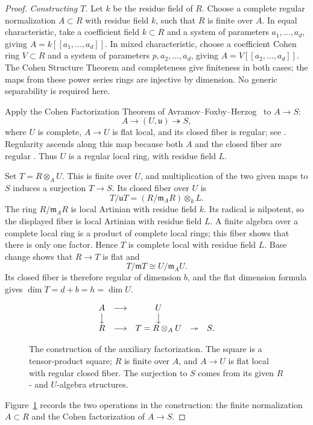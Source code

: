 \begin{proof}
\emph{Constructing $T$.}
Let $k$ be the residue field of $R$.  Choose a complete regular
normalization $A\subset R$ with residue field $k$, such that $R$ is
finite over $A$.  In equal characteristic, take a coefficient field
$k\subset R$ and a system of parameters $a_1,\ldots,a_d$, giving
$A=k[[a_1,\ldots,a_d]]$.  In mixed characteristic, choose a coefficient
Cohen ring $V\subset R$ and a system of parameters
$p,a_2,\ldots,a_d$, giving $A=V[[a_2,\ldots,a_d]]$.  The Cohen
Structure Theorem and completeness give finiteness in both cases;
the maps from these power series rings are injective by dimension.
No generic separability is required here.

Apply the Cohen Factorization Theorem of
Avramov--Foxby--Herzog~\cite{AFH} to $A\to S$:
\[
  A\longrightarrow (U,\mathfrak u)\twoheadrightarrow S,
\]
where $U$ is complete, $A\to U$ is flat local, and its closed fiber is
regular; see \cite[Theorem~3.1]{Ma}.  Regularity ascends along this map
because both $A$ and the closed fiber are regular
\cite[Tag~031E]{Stacks}. Thus $U$ is a
regular local ring, with residue field $L$.

Set $T=R\otimes_A U$.  This is finite over $U$, and multiplication of
the two given maps to $S$ induces a surjection $T\to S$.  Its closed
fiber over $U$ is
\[
  T/\mathfrak uT=(R/\mathfrak m_A R)\otimes_k L.
\]
The ring $R/\mathfrak m_A R$ is local Artinian with residue field $k$.
Its radical is nilpotent, so the displayed fiber is local Artinian
with residue field $L$.  A finite algebra over a complete local ring
is a product of complete local rings; this fiber shows that there is
only one factor.  Hence $T$ is complete local with residue field $L$.
Base change shows that $R\to T$ is flat and
\[
  T/\mathfrak mT\cong U/\mathfrak m_A U.
\]
Its closed fiber is therefore regular of dimension $b$, and the flat
dimension formula gives $\dim T=d+b=h=\dim U$.

\begin{figure}[ht]
\centering
\[
\begin{array}{ccccc}
 A&\longrightarrow&U&&\\
 \big\downarrow&&\big\downarrow&&\\
 R&\longrightarrow&T=R\otimes_A U&\twoheadrightarrow&S .
\end{array}
\]
\caption{The construction of the auxiliary factorization. The square
is a tensor-product square; $R$ is finite over $A$, and $A\to U$
is flat local with regular closed fiber. The surjection to $S$
comes from its given $R$- and $U$-algebra structures.}
\label{fig:factorization}
\end{figure}
Figure~\ref{fig:factorization} records the two operations in the
construction: the finite normalization $A\subset R$ and the Cohen
factorization of $A\to S$.


\end{proof}
